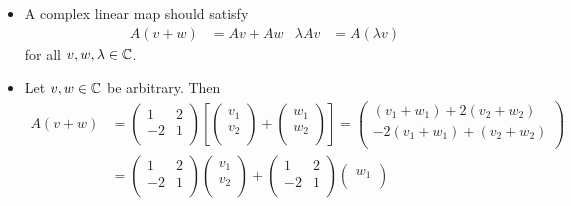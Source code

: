 \documentclass[../notes.tex]{subfiles}
\begin{document}
\begin{itemize}
\begin{itemize}
        \item A complex linear map should satisfy
        \begin{align*}
            A(v+w) &= Av+Aw&
            \lambda Av &= A(\lambda v)
        \end{align*}
        for all $v,w,\lambda\in\mathbb{C}$.
        \item Let $v,w\in\mathbb{C}$ be arbitrary. Then
        \begin{align*}
            A(v+w) &=
            \begin{pmatrix}
                1 & 2\\
                -2 & 1\\
            \end{pmatrix}
            \left[
                \begin{pmatrix}
                    v_1\\
                    v_2\\
                \end{pmatrix}
                +
                \begin{pmatrix}
                    w_1\\
                    w_2\\
                \end{pmatrix}
            \right]
            =
            \begin{pmatrix}
                (v_1+w_1)+2(v_2+w_2)\\
                -2(v_1+w_1)+(v_2+w_2)\\
            \end{pmatrix}\\
            &=
            \begin{pmatrix}
                1 & 2\\
                -2 & 1\\
            \end{pmatrix}
            \begin{pmatrix}
                v_1\\
                v_2\\
            \end{pmatrix}
            +
            \begin{pmatrix}
                1 & 2\\
                -2 & 1\\
            \end{pmatrix}
            \begin{pmatrix}
                w_1\\

\end{pmatrix}
\end{align*}
\end{itemize}
\end{itemize}
\end{document}
